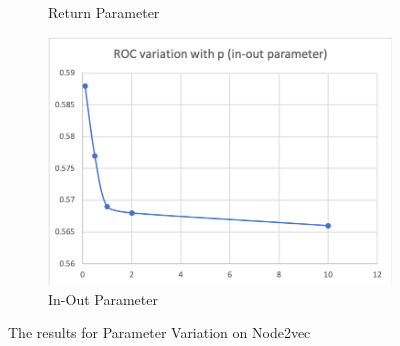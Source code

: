 \documentclass[sigconf]{acmart}
\begin{document}
\begin{figure}[h]
\begin{subfigure}[b]{0.49\linewidth}
    \caption{Return Parameter}
  \end{subfigure}
  \begin{subfigure}[b]{0.49\linewidth}
    \includegraphics[width=\linewidth]{Images/Picture 7.png}
    \caption{In-Out Parameter}
  \end{subfigure}
  \caption{The results for Parameter Variation on Node2vec}
  \label{fig:res4.3}
\end{figure}
\end{document}
